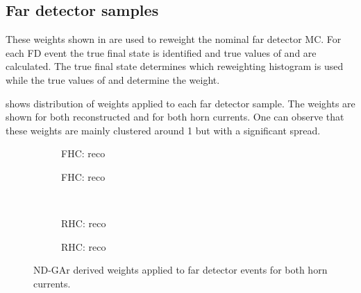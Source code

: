 \subsection{Far detector samples}
\label{sec:dune_ndrwt:rwt:fd}

These weights shown in  are used to reweight the nominal far detector MC.
For each FD event the true final state is identified and true values of \evis and \pvis are calculated.
The true final state determines which reweighting histogram is used while the true values of \evis and \pvis determine the weight.

 shows distribution of weights applied to each far detector sample.
The weights are shown for both reconstructed \numu and \nue for both horn currents.
One can observe that these weights are mainly clustered around 1 but with a significant spread.

\begin{figure}[h]
	\begin{subfigure}[t]{.5\linewidth}
		\begin{adjustbox}{max totalsize=\linewidth, center}
			
		\end{adjustbox}
		\caption{FHC: reco \numu}
	\end{subfigure}
	\hfill
	\begin{subfigure}[t]{.5\linewidth}
		\begin{adjustbox}{max totalsize=\linewidth, center}
			
		\end{adjustbox}
		\caption{FHC: reco \nue}
	\end{subfigure}	\\
	\begin{subfigure}[t]{.5\linewidth}
		\begin{adjustbox}{max totalsize=\linewidth, center}
			
		\end{adjustbox}
		\caption{RHC: reco \numu}
	\end{subfigure}
	\hfill
	\begin{subfigure}[t]{.5\linewidth}
		\begin{adjustbox}{max totalsize=\linewidth, center}
			
		\end{adjustbox}
		\caption{RHC: reco \nue}
	\end{subfigure}
	\caption[ND-GAr derived weights applied to far detector events]{ND-GAr derived weights applied to far detector events for both horn currents.}
	\label{fig:fdWeights}
\end{figure}


